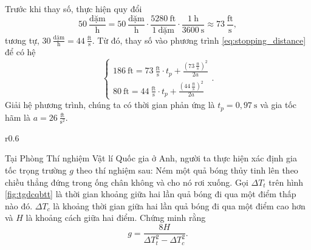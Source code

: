 \documentclass[a4paper, titlepage, openany]{book}
\newcounter{exercise}
\begin{document}
Trước khi thay số, thực hiện quy đổi $$50\ \frac{\text{dặm}}{\text{h}}=50\ \frac{\text{dặm}}{\text{h}}\cdot\frac{5280\ \text{ft}}{1\ \text{dặm}}\cdot\frac{1\ \text{h}}{3600\ \text{s}}\approx 73\ \frac{\text{ft}}{\text{s}},$$ tương tự, $30\ \frac{\text{dặm}}{\text{h}}=44\ \frac{\text{ft}}{\text{s}}$. Từ đó, thay số vào phương trình \ref{eq:stopping_distance} để có hệ
\begin{equation*}
   \begin{cases}
      186\ \text{ft} = 73\ \frac{\text{ft}}{\text{s}}\cdot t_p + \frac{\left(73\ \frac{\text{ft}}{\text{s}}\right)^2}{2a} \\
      80\ \text{ft} = 44\ \frac{\text{ft}}{\text{s}}\cdot t_p + \frac{\left(44\ \frac{\text{ft}}{\text{s}}\right)^2}{2a} 
   \end{cases}.
\end{equation*}
Giải hệ phương trình, chúng ta có thời gian phản ứng là $t_p=\boxed{0{,}97\ \text{s}}$ và gia tốc hãm là $a = \boxed{26\ \frac{\text{ft}}{\text{s}^2}}$.

\begin{wrapfigure}{r}{0.6\textwidth} %
    \centering

   \caption{Đồ thị thời gian - độ cao của quả bóng thủy tinh}
   \label{fig:tgdcqbtt}
\end{wrapfigure}

\exercise Tại Phòng Thí nghiệm Vật lí Quốc gia ở Anh, người ta thực hiện xác định gia tốc trọng trường $g$ theo thí nghiệm sau: Ném một quả bóng thủy tinh lên theo chiều thẳng đứng trong ống chân không và cho nó rơi xuống. Gọi $\Delta T_t$ trên hình \ref{fig:tgdcqbtt} là thời gian khoảng giữa hai lần quả bóng đi qua một điểm thấp nào đó. $\Delta T_c$ là khoảng thời gian giữa hai lần quả bóng đi qua một điểm cao hơn và $H$ là khoảng cách giữa hai điểm. Chứng minh rằng $$g=\frac{8H}{\Delta T_t^2 - \Delta T_c^2}.$$
\end{document}
